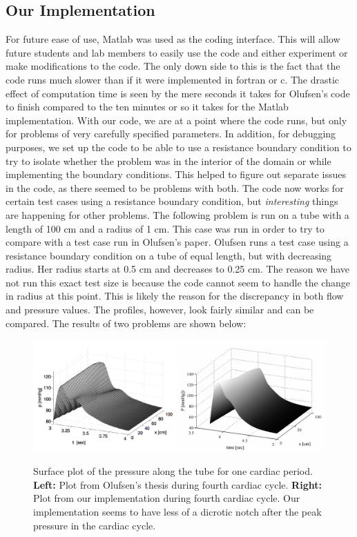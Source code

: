 \documentclass[12pt]{article}
\begin{document}
\subsection{Our Implementation}
For future ease of use, Matlab was used as the coding interface. This will allow future students and lab members to easily use the code and either experiment or make modifications to the code. The only down side to this is the fact that the code runs much slower than if it were implemented in fortran or c. The drastic effect of computation time is seen by the mere seconds it takes for Olufsen's code to finish compared to the ten minutes or so it takes for the Matlab implementation. With our code, we are at a point where the code runs, but only for problems of very carefully specified parameters. In addition, for debugging purposes, we set up the code to be able to use a resistance boundary condition to try to isolate whether the problem was in the interior of the domain or while implementing the boundary conditions. This helped to figure out separate issues in the code, as there seemed to be problems with both. The code now works for certain test cases using a resistance boundary condition, but \textit{interesting} things are happening for other problems. The following problem is run on a tube with a length of 100 cm and a radius of 1 cm. This case was run in order to try to compare with a test case run in Olufsen's paper. Olufsen runs a test case using a resistance boundary condition on a tube of equal length, but with decreasing radius. Her radius starts at 0.5 cm and decreases to 0.25 cm. The reason we have not run this exact test size is because the code cannot seem to handle the change in radius at this point. This is likely the reason for the discrepancy in both flow and pressure values. The profiles, however, look fairly similar and can be compared. The results of two problems are shown below:

\begin{figure}[ht]
	\centering
	\includegraphics[width=6in]{pplot}
	\label{ours}
	\caption{Surface plot of the pressure along the tube for one cardiac period. \textbf{Left:} Plot from Olufsen's thesis during fourth cardiac cycle. \textbf{Right:} Plot from our implementation during fourth cardiac cycle. Our implementation seems to have less of a dicrotic notch after the peak pressure in the cardiac cycle.}
\end{figure}
\end{document}
